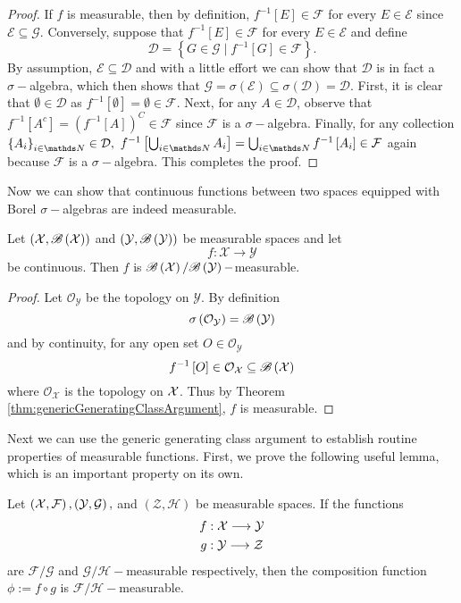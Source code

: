 \begin{proof}
If $f$ is measurable, then by definition, $f^{-1}\left[E\right]\in\mathcal{F}$
for every $E\in\mathcal{E}$ since $\mathcal{E}\subseteq\mathcal{G}$.
Conversely, suppose that $f^{-1}\left[E\right]\in\mathcal{F}$ for
every $E\in\mathcal{E}$ and define 
\[
\mathcal{D}=\left\{ G\in\mathcal{G}\mid f^{-1}\left[G\right]\in\mathcal{F}\right\} .
\]
By assumption, $\mathcal{E}\subseteq\mathcal{D}$ and with a little
effort we can show that $\mathcal{D}$ is in fact a $\sigma-$algebra,
which then shows that $\mathcal{G}=\sigma\left(\mathcal{E}\right)\subseteq\sigma\left(\mathcal{D}\right)=\mathcal{D}.$
First, it is clear that $\emptyset\in\mathcal{D}$ as $f^{-1}\left[\emptyset\right]=\emptyset\in\mathcal{F}$.
Next, for any $A\in\mathcal{D}$, observe that $f^{-1}\left[A^{c}\right]=\left(f^{-1}\left[A\right]\right)^{C}\in\mathcal{F}$
since $\mathcal{F}$ is a $\sigma-$algebra. Finally, for any collection
$\left\{ A_{i}\right\} _{i\in\N}\in\mathcal{D},$ $f^{-1}\left[\bigcup_{i\in\N}A_{i}\right]=\bigcup_{i\in\N}f^{-1}\left[A_{i}\right]\in\mathcal{F}$
again because $\mathcal{F}$ is a $\sigma-$algebra. This completes
the proof.
\end{proof}
Now we can show that continuous functions between two spaces equipped
with Borel $\sigma-$algebras are indeed measurable.
\begin{cor}
\label{cor:continuousFunctionsAreMeasurable}Let $\left(\mathcal{X},\mathscr{B}\left(\mathcal{X}\right)\right)$
and $\left(\mathcal{Y},\mathscr{B}\left(\mathcal{Y}\right)\right)$ be
measurable spaces and let 
\[
f:\mathcal{X}\longrightarrow\mathcal{Y}
\]
be continuous. Then $f$ is $\mathscr{B}\left(\mathcal{X}\right)/\mathscr{B}\left(\mathcal{Y}\right)-$measurable.
\end{cor}

\begin{proof}
Let $\mathcal{O}_{\mathcal{Y}}$ be the topology on $\mathcal{Y}$.
By definition
\[
\sigma\left(\mathcal{O}_{\mathcal{Y}}\right)=\mathscr{B}\left(\mathcal{Y}\right)
\]
and by continuity, for any open set $O\in\mathcal{O}_{\mathcal{Y}}$
\[
f^{-1}\left[O\right]\in\mathcal{O}_{\mathcal{X}}\subseteq\mathscr{B}\left(\mathcal{X}\right)
\]
where $\mathcal{O}_{\mathcal{X}}$ is the topology on $\mathcal{X}$. Thus
by Theorem \ref{thm:genericGeneratingClassArgument}, $f$ is measurable.
\end{proof}
Next we can use the generic generating class argument to establish
routine properties of measurable functions. First, we prove the following
useful lemma, which is an important property on its own.
\begin{lem}
\label{lem:compositionMeasurableFunctions}Let $\left(\mathcal{X},\mathcal{F}\right),\left(\mathcal{Y},\mathcal{G}\right),$
and $\left(\mathcal{Z},\mathcal{H}\right)$ be measurable spaces.
If the functions
\begin{align*}
f & :\mathcal{X}\longrightarrow\mathcal{Y}\\
g & :\mathcal{Y}\longrightarrow\mathcal{Z}
\end{align*}
are $\mathcal{F}/\mathcal{G}$ and $\mathcal{G}/\mathcal{H}-$measurable
respectively, then the composition function $\phi:=f\circ g$ is $\mathcal{F}/\mathcal{H}-$measurable.
\end{lem}

